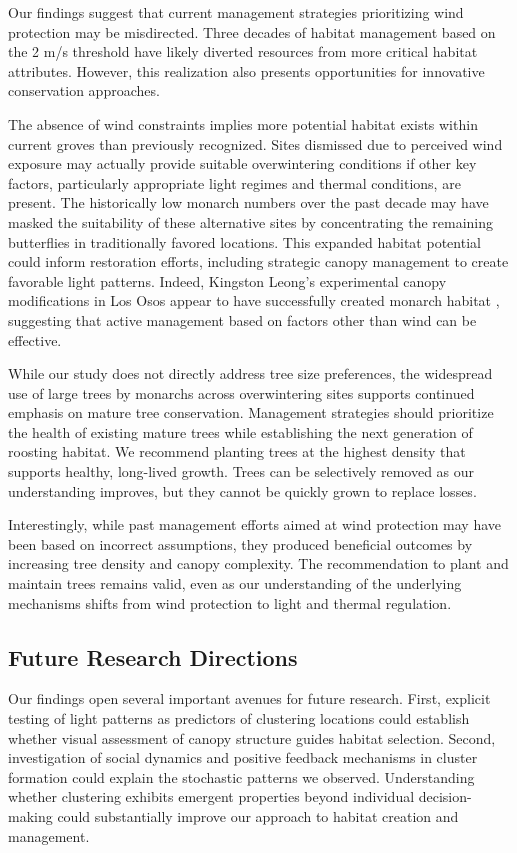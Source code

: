 Our findings suggest that current management strategies prioritizing wind protection may be misdirected. Three decades of habitat management based on the 2 m/s threshold have likely diverted resources from more critical habitat attributes. However, this realization also presents opportunities for innovative conservation approaches.

The absence of wind constraints implies more potential habitat exists within current groves than previously recognized. Sites dismissed due to perceived wind exposure may actually provide suitable overwintering conditions if other key factors, particularly appropriate light regimes and thermal conditions, are present. The historically low monarch numbers over the past decade may have masked the suitability of these alternative sites by concentrating the remaining butterflies in traditionally favored locations. This expanded habitat potential could inform restoration efforts, including strategic canopy management to create favorable light patterns. Indeed, Kingston Leong's experimental canopy modifications in Los Osos appear to have successfully created monarch habitat \autocite{kingston_spatial_2016}, suggesting that active management based on factors other than wind can be effective.

While our study does not directly address tree size preferences, the widespread use of large trees by monarchs across overwintering sites supports continued emphasis on mature tree conservation. Management strategies should prioritize the health of existing mature trees while establishing the next generation of roosting habitat. We recommend planting trees at the highest density that supports healthy, long-lived growth. Trees can be selectively removed as our understanding improves, but they cannot be quickly grown to replace losses.

Interestingly, while past management efforts aimed at wind protection may have been based on incorrect assumptions, they produced beneficial outcomes by increasing tree density and canopy complexity. The recommendation to plant and maintain trees remains valid, even as our understanding of the underlying mechanisms shifts from wind protection to light and thermal regulation.

\subsection{Future Research Directions}

Our findings open several important avenues for future research. First, explicit testing of light patterns as predictors of clustering locations could establish whether visual assessment of canopy structure guides habitat selection. Second, investigation of social dynamics and positive feedback mechanisms in cluster formation could explain the stochastic patterns we observed. Understanding whether clustering exhibits emergent properties beyond individual decision-making could substantially improve our approach to habitat creation and management.

